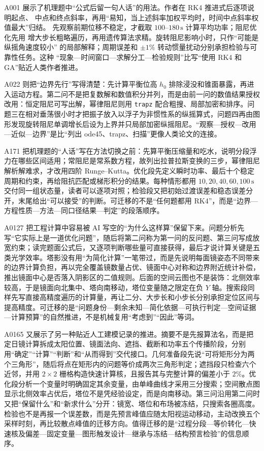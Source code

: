 A001 展示了机理题中“公式后留一句人话”的用法。作者在 RK4 推进式后逐项说明起点、
中点和终点斜率，再用“易知，当上述斜率加权平均时，时间中点斜率权值最大”归结。
先观察前期位移不稳定，才截取 $100$--$180\,\mathrm{s}$ 计算平均功率；阻尼优化先用
增大步长粗略遍历，再用遗传算法求精。旋转阻尼影响小时，只作“可能是纵摇角速度较小”
的局部解释；周期误差和 $\pm1\%$ 转动惯量扰动分别承担检验与可靠性任务。这种
“现象—时间窗口—求解分工—检验规则”比写“使用 RK4 和 GA”贴近人类作者推进。

A022 则把“边界先行”写得清楚：先计算平衡位高 $h_0$ 排除浸没和锥面暴露，再进入运动方程。第二问不是把复数解和数值积分并列，而是由前一问的数值结果授权改用：恒定阻尼可写出解，幂律阻尼则用 \texttt{trapz} 配合粗搜、局部加密和排序。问题三在相对垂荡很小时才把振子放入以浮子为非惯性系的纵摇算式，问题四再由图形发现旋转阻尼单调增长后设为上界并只局部加密纵摇阻尼。“观察—授权—改用—近似—边界”是比“列出 ode45、trapz、扫描”更像人类论文的连接。

A171 把机理题的“人话”写在方法切换之前：先算平衡压缩量和吃水，说明分段浮力在哪些区间适用；常阻尼是常系数方程，故列出拉普拉斯变换的三步，幂律阻尼解析解难求，才改用四阶 Runge--Kutta。优化段先定义瞬时功率、最后十个稳定周期和约束，再给阻抗匹配或梯形积分的结果。每种情形都用 $10,20,40,60,100\,\mathrm{s}$ 交付同一组状态量，读者可以逐项对照；检验段又把初始过渡误差和稳态误差分开，末尾给出“可以接受”的判断。可迁移的不是“任何题都用 RK4”，而是“边界—方程性质—方法—同口径结果—判定”的段落顺序。

A0127 把工程计算中容易被 AI 写空的“为什么这样算”保留下来。问题分析先写“它实际上是一道优化问题”，随后将第二问称为第一问的反问题、第三问写成放宽约束；读完题面公式后，又逐项判断哪些量可直接获得，最后才说计算关键是五类光学效率。塔影没有用“为简化计算”一笔带过，而是先说明每面镜姿态不同带来的边界计算负担，再以完全覆盖镜数量占优、镜面中心对称和边界附近统计补偿，推出镜面中心是否落入阴影区的二值规则。后面的空间云图也不是装饰：北侧效率较高，于是镜面向北集中、塔向南移动，塔位变量随之限定在负 $Y$ 轴。搜索段同样先写直接高精度遍历的计算量，再让二分、大步长和小步长分别承担定位区间与提高精度。可迁移的是“问题身份—剩余未知—简化依据—可执行判定—空间证据—计算预算”的自然推进，不是机械复用“考虑到”“因此”等词。

A0165 又展示了另一种贴近人工建模记录的推进。摘要不是先报算法名，而是把定日镜计算拆成太阳位置、镜面法向、遮挡、截断和功率五个传播阶段，分别用“确定”“计算”“判断”和“从而得到”交代接口。几何准备段先说“可将矩形分为两个三角形”，随后将点在矩形内的问题等价成两次三角形判定；遮挡段只检查六个近邻，并用 $2\times2$ 栅格构造快速计算核，且报告其与完整计算的偏差小于 $2\%$。优化段分析一个变量时明确固定其余变量，由单峰曲线才采用三分搜索；空间散点图显示北侧效率占优后，塔位不是凭经验设定，而是向南移动。第三问沿用第二问时又把“保留什么”和“新求什么”分开：镜宽、塔位和布场被冻结，只搜索各圈高度。检验也不是再报一个误差数，而是先预言峰值应随太阳视运动移动，主动改换五个采样时刻，再比较散点峰值的迁移方向。值得迁移的是“过程分段—等价转化—快速核及偏差—固定变量—图形触发设计—继承与冻结—结构预言检验”的信息顺序。

